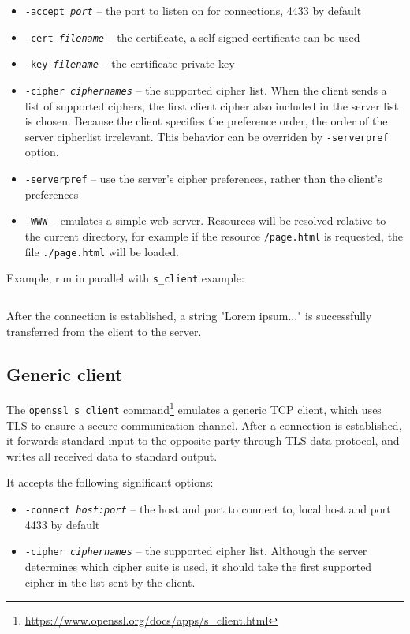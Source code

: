 \begin{itemize}
  \item \texttt{-accept \textit{port}} -- the port to listen on for connections, 4433 by default
  \item \texttt{-cert \textit{filename}} -- the certificate, a self-signed certificate can be used
  \item \texttt{-key \textit{filename}} -- the certificate private key
  \item \texttt{-cipher \textit{ciphernames}} -- the supported cipher list. When the client sends a list of supported ciphers, the first client cipher also included in the server list is chosen. Because the client specifies the preference order, the order of the server cipherlist irrelevant. This behavior can be overriden by \texttt{-serverpref} option.
  \item \texttt{-serverpref} -- use the server's cipher preferences, rather than the client's preferences
  \item \texttt{-WWW} -- emulates a simple web server. Resources will be resolved relative to the current directory, for example if the resource \texttt{/page.html} is requested, the file \texttt{./page.html} will be loaded.
\end{itemize}

Example, run in parallel with \texttt{s\_client} example:

\inputminted{text}{code/openssl-s_server-example.txt}

After the connection is established, a string "Lorem ipsum..." is successfully transferred from the client to the server.


\subsection{Generic client}
\label{toc/openssl-s_client}

The \texttt{openssl s\_client} command\footnote{\url{https://www.openssl.org/docs/apps/s\_client.html}} emulates a generic TCP client, which uses TLS to ensure a secure communication channel. After a connection is established, it forwards standard input to the opposite party through TLS data protocol, and writes all received data to standard output.

It accepts the following significant options:

\begin{itemize}
\item \texttt{-connect \textit{host:port}} -- the host and port to connect to, local host and port 4433 by default
\item \texttt{-cipher \textit{ciphernames}} -- the supported cipher list. Although the server determines which cipher suite is used, it should take the first supported cipher in the list sent by the client.
\end{itemize}

